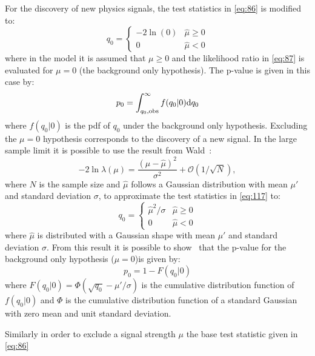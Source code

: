 For the discovery of new physics signals, the test statistics in \cref{eq:86} is
modified to:
\begin{equation}
  \label{eq:116}
  q_0 =
  \left\{
    \begin{array}{lr}
      - 2 \ln(0)  & \hat{\mu} \geq 0 \\
      0 & \hat{\mu} < 0
    \end{array}
    \right.
\end{equation}
where in the model it is assumed that $\mu \geq 0$ and the likelihood ratio in
\cref{eq:87} is evaluated for $\mu = 0$ (the background only hypothesis). The
p-value is given in this case by:
\begin{equation}
  \label{eq:117}
  p_0 = \int_{q_0, \mathrm{obs}}^\infty f(q_0 | 0) \mathrm{d} q_0
\end{equation}
where $f(q_0 | 0)$ is the \gls{pdf} of $q_0$ under the background only
hypothesis. Excluding the $\mu = 0$ hypothesis corresponds to the discovery of a
new signal. In the large sample limit it is possible to use the result from
Wald~\cite{WaldApproximation}:
\begin{equation}
  \label{eq:118}
  - 2 \ln \lambda(\mu) = \frac{(\mu - \hat{\mu})^2}{\sigma^2} + \mathcal{O}(1/\sqrt{N}),
\end{equation}
where $N$ is the sample size and $\hat{\mu}$ follows a Gaussian distribution
with mean $\mu'$ and standard deviation $\sigma$, to approximate the test
statistics in \cref{eq:117} to:
\begin{equation}
  \label{eq:119}
  q_0 = \left\{
    \begin{array}{lr}
      \hat{\mu}^2/\sigma & \hat{\mu} \geq 0 \\
      0 & \hat{\mu} < 0
    \end{array}
    \right.
\end{equation}
where $\hat{\mu}$ is distributed with a Gaussian shape with mean $\mu'$ and
standard deviation $\sigma$. From this result it is possible to
show~\cite{StatProcedure} that the p-value for the background only hypothesis
($\mu = 0$)is given by:
\begin{equation}
  \label{eq:120}
  p_0 = 1 - F(q_0|0)
\end{equation}
where $F(q_0|0) = \Phi \left( \sqrt{q_0} - \mu' / \sigma \right)$ is the
cumulative distribution function of $f(q_0|0)$ and $\Phi$ is the cumulative
distribution function of a standard Gaussian with zero mean and unit standard
deviation.

Similarly in order to exclude a signal strength $\mu$ the base test statistic
given in \cref{eq:86}
